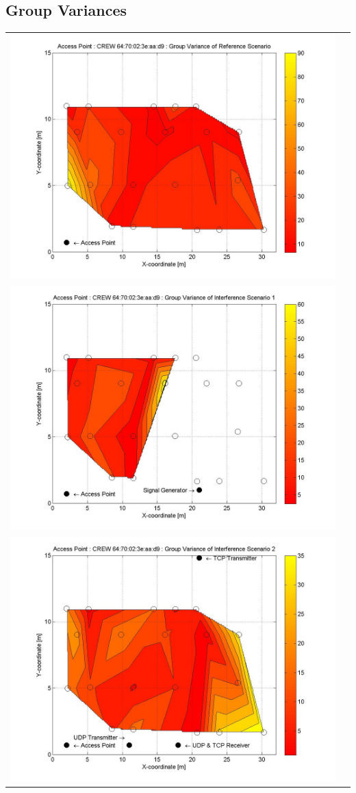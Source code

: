 \documentclass[11pt,a4paper,headinclude,footinclude,chapterprefix=on]{scrreprt}
\begin{document}
\subsection{Group Variances} 
\begin{longtable}
	{lr} 
	\includegraphics[width=13cm]{../../Source/plot/CREW_d9/d9_Ref_Group_Variance.jpg} \\
	\includegraphics[width=13cm]{../../Source/plot/CREW_d9/d9_Sig_Group_Variance.jpg} \\
	\includegraphics[width=13cm]{../../Source/plot/CREW_d9/d9_Wifi_Group_Variance.jpg} \\

\end{longtable}
\end{document}
